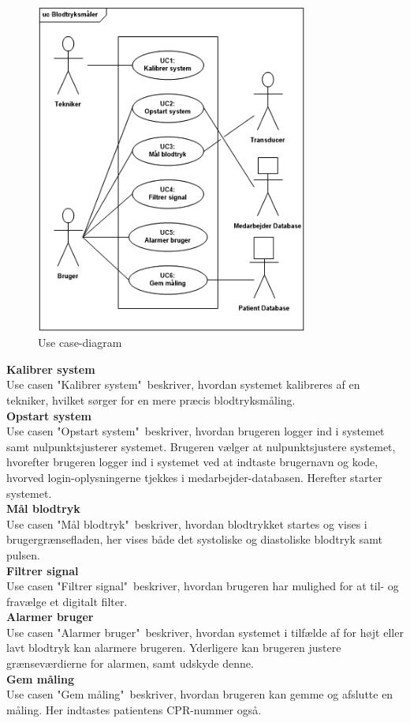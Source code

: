 \begin{figure}[H]
	\centering
	\includegraphics[width=0.8\textwidth]{Figurer/ISE/UcDiagram2}
	\caption{Use case-diagram}
	\label{UC diagram}
\end{figure}

\textbf{Kalibrer system}\\
Use casen "Kalibrer system"\ beskriver, hvordan systemet kalibreres af en tekniker, hvilket sørger for en mere præcis blodtryksmåling.\\[1ex]
\textbf{Opstart system}\\
Use casen "Opstart system"\ beskriver, hvordan brugeren logger ind i systemet samt nulpunktsjusterer systemet. Brugeren vælger at nulpunktsjustere systemet, hvorefter brugeren logger ind i systemet ved at indtaste brugernavn og kode, hvorved login-oplysningerne tjekkes i medarbejder-databasen. Herefter starter systemet.\\[1ex]
\textbf{Mål blodtryk}\\
Use casen "Mål blodtryk"\ beskriver, hvordan blodtrykket startes og vises i brugergrænsefladen, her vises både det systoliske og diastoliske blodtryk samt pulsen.\\[1ex]
\textbf{Filtrer signal}\\
Use casen "Filtrer signal"\ beskriver, hvordan brugeren har mulighed for at til- og fravælge et digitalt filter.\\[1ex]
\textbf{Alarmer bruger}\\
Use casen "Alarmer bruger"\ beskriver, hvordan systemet i tilfælde af for højt eller lavt blodtryk kan alarmere brugeren. Yderligere kan brugeren justere grænseværdierne for alarmen, samt udskyde denne.\\[1ex]
\textbf{Gem måling}\\
Use casen "Gem måling"\ beskriver, hvordan brugeren kan gemme og afslutte en måling. Her indtastes patientens CPR-nummer også.

